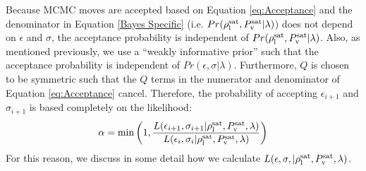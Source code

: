 \documentclass[preprint,letterpaper,floatfix,citeautoscript,aip,jcp]{revtex4-1}
\begin{document}

Because MCMC moves are accepted based on Equation \ref{eq:Acceptance} and the denominator in Equation \ref{Bayes Specific} (i.e. $Pr(\rho_{\rm l}^{\rm sat},P_{\rm v}^{\rm sat}|\lambda)$) does not depend on $\epsilon$ and $\sigma$, the acceptance probability is independent of $Pr(\rho_{\rm l}^{\rm sat},P_{\rm v}^{\rm sat}|\lambda)$. 
Also, as mentioned previously, we use a ``weakly informative prior'' such that the acceptance probability is independent of $Pr(\epsilon,\sigma|\lambda)$.
Furthermore, $Q$ is chosen to be symmetric such that the $Q$ terms in the numerator and denominator of Equation \ref{eq:Acceptance} cancel. Therefore, the probability of accepting $\epsilon_{i+1}$ and $\sigma_{i+1}$ is based completely on the likelihood:
\begin{equation} \label{eq:Acceptance Assumptions}
\alpha = \min\left(1,\frac{L(\epsilon_{i+1},\sigma_{i+1}|\rho_{\rm l}^{\rm sat},P_{\rm v}^{\rm sat},\lambda)}{L(\epsilon_i,\sigma_i|\rho_{\rm l}^{\rm sat},P_{\rm v}^{\rm sat},\lambda)}\right)
\end{equation} 
For this reason, we discuss in some detail how we calculate $L(\epsilon,\sigma,|\rho_{\rm l}^{\rm sat},P_{\rm v}^{\rm sat},\lambda)$.  
\end{document}
